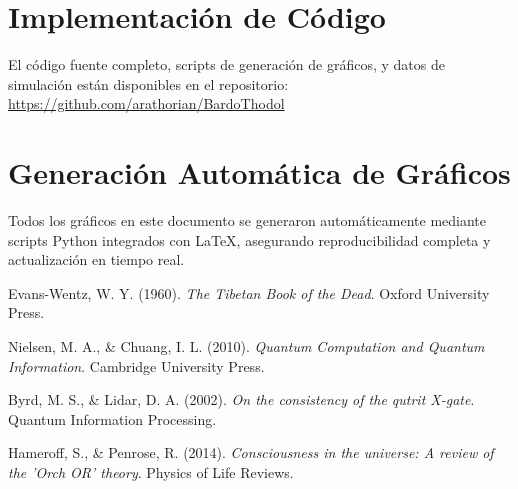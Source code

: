 \documentclass[12pt,a4paper]{article}
\theoremstyle{definition}
\begin{document}
\appendix
\section{Implementación de Código}

El código fuente completo, scripts de generación de gráficos, y datos de simulación están disponibles en el repositorio:
\url{https://github.com/arathorian/BardoThodol}

\section{Generación Automática de Gráficos}

Todos los gráficos en este documento se generaron automáticamente mediante scripts Python integrados con \LaTeX, asegurando reproducibilidad completa y actualización en tiempo real.

\begin{thebibliography}{9}
Evans-Wentz, W. Y. (1960). \emph{The Tibetan Book of the Dead}. Oxford University Press.

Nielsen, M. A., \& Chuang, I. L. (2010). \emph{Quantum Computation and Quantum Information}. Cambridge University Press.

Byrd, M. S., \& Lidar, D. A. (2002). \emph{On the consistency of the qutrit X-gate}. Quantum Information Processing.

Hameroff, S., \& Penrose, R. (2014). \emph{Consciousness in the universe: A review of the 'Orch OR' theory}. Physics of Life Reviews.
\end{thebibliography}
\end{document}
